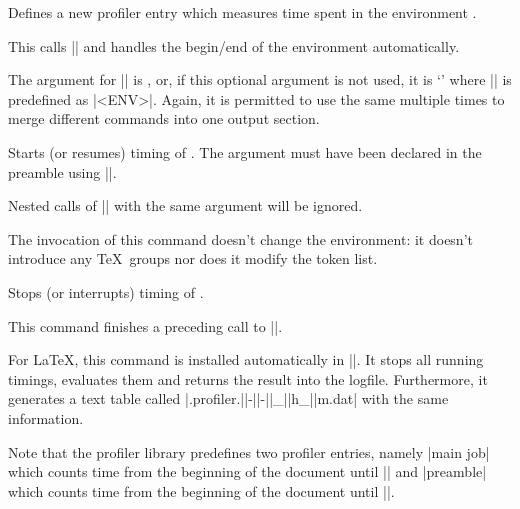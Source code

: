 \begin{command}{\pgfprofilenewforenvironment{}}
    Defines a new profiler entry which measures time spent in the environment
    .

    This calls |\pgfprofilenew| and handles the begin/end of the environment
    automatically.

    The argument for |\pgfprofilenew| is , or, if
    this optional argument is not used, it is
    `\declareandlabel{\pgfprofileenv}' where
    |\pgfprofileenv| is predefined as |<ENV>|. Again, it is permitted to use
    the same  multiple times to merge different
    commands into one output section.
\end{command}

\begin{command}{\pgfprofilestart{}}
    Starts (or resumes) timing of . The argument must
    have been declared in the preamble using |\pgfprofilenew|.

    Nested calls of |\pgfprofilestart| with the same argument will be ignored.

    The invocation of this command doesn't change the environment: it doesn't
    introduce any \TeX\ groups nor does it modify the token list.
\end{command}

\begin{command}{\pgfprofileend{}}
    Stops (or interrupts) timing of .

    This command finishes a preceding call to |\pgfprofilestart|.
\end{command}

\begin{command}{\pgfprofilepostprocess}
    For \LaTeX, this command is installed automatically in ||. It
    stops all running timings, evaluates them and returns the result into the
    logfile. Furthermore, it generates a text table called
    |\jobname.profiler.||-||-||_||h_||m.dat|
    with the same information.

    Note that the profiler library predefines two profiler entries, namely
    |main job| which counts time from the beginning of the document until
    |\pgfprofilepostprocess| and |preamble| which counts time from the
    beginning of the document until ||.
\end{command}

